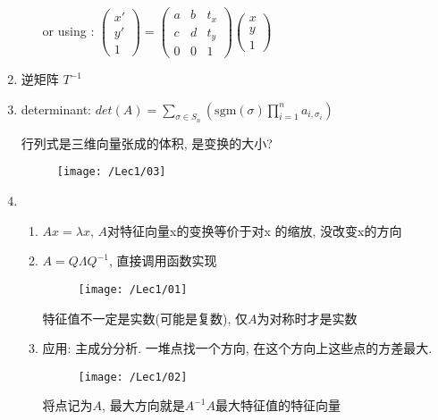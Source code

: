 \begin{enumerate}
\begin{enumerate}
            or using : $\begin{pmatrix}
                x'\\ y' \\ 1
            \end{pmatrix}=\begin{pmatrix}
                a& b &t_x\\ c&d&t_y\\ 0&0&1
            \end{pmatrix}\begin{pmatrix}
                x\\ y\\1
            \end{pmatrix}$
        \end{enumerate}
        \item 逆矩阵 $T^{-1}$
        \item determinant: $det(A)=\sum_{\sigma\in S_n}\left(\mathrm{sgm}(\sigma)\prod_{i=1}^n a_{i,\sigma_i}\right)$
        
        行列式是三维向量张成的体积, 是变换的大小?
        \begin{figure}[H]
            \centering
            \texttt{[image: /Lec1/03]}
        \end{figure}
        \item {}
        \begin{enumerate}
            \item $Ax=\lambda x$, $A$对特征向量x的变换等价于对x 的缩放, 没改变x的方向
            \item $A=Q\Lambda Q^{-1}$, 直接调用函数实现
            \begin{figure}[H]
                \centering
                \texttt{[image: /Lec1/01]}
            \end{figure}
            特征值不一定是实数(可能是复数), 仅$A$为对称时才是实数
            \item 应用: 主成分分析. 一堆点找一个方向, 在这个方向上这些点的方差最大. 
            \begin{figure}[H]
                \centering
                \texttt{[image: /Lec1/02]}
            \end{figure}
            将点记为$A$, 最大方向就是$A^{-1}A$最大特征值的特征向量
        \end{enumerate}
    \end{enumerate}